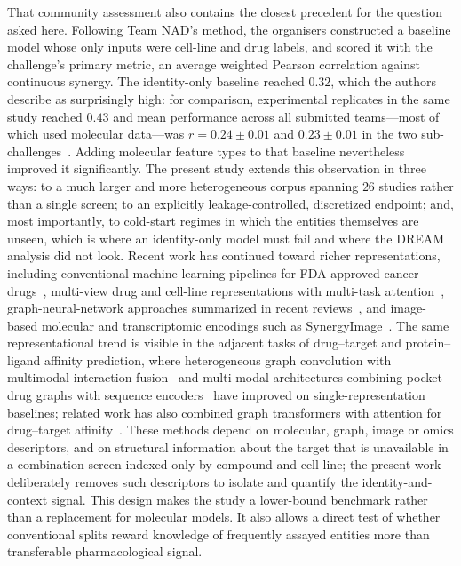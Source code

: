 \documentclass{bmcart}
\begin{document}
That community assessment also contains the closest precedent for the question asked here. Following
Team NAD's method, the organisers constructed a baseline model whose only inputs were cell-line and
drug labels, and scored it with the challenge's primary metric, an average weighted Pearson correlation
against continuous synergy. The identity-only baseline reached $0.32$, which the authors describe as
surprisingly high: for comparison, experimental replicates in the same study reached $0.43$ and mean
performance across all submitted teams---most of which used molecular data---was
$r = 0.24 \pm 0.01$ and $0.23 \pm 0.01$ in the two sub-challenges~\cite{menden2019}. Adding molecular
feature types to that baseline nevertheless improved it significantly. The present study extends this
observation in three ways: to a much larger and more heterogeneous corpus spanning $26$ studies rather
than a single screen; to an explicitly leakage-controlled, discretized endpoint; and, most importantly,
to cold-start regimes in which the entities themselves are unseen, which is where an identity-only
model must fail and where the DREAM analysis did not look. Recent work has
continued toward richer representations, including conventional machine-learning pipelines for
FDA-approved cancer drugs~\cite{abdelhafeez2024}, multi-view drug and cell-line representations with
multi-task attention~\cite{monem2024}, graph-neural-network approaches summarized in recent
reviews~\cite{besharatifard2024}, and image-based molecular and transcriptomic encodings such as
SynergyImage~\cite{mehrabani2025}. The same representational trend is visible in the adjacent tasks of
drug--target and protein--ligand affinity prediction, where heterogeneous graph convolution with
multimodal interaction fusion~\cite{wang2026ihgcn} and multi-modal architectures combining
pocket--drug graphs with sequence encoders~\cite{wang2025mmpd} have improved on single-representation
baselines; related work has also combined graph transformers with attention for drug--target
affinity~\cite{monem2024}. These methods depend on molecular, graph, image or omics
descriptors, and on structural information about the target that is unavailable in a combination
screen indexed only by compound and cell line; the present work deliberately removes such descriptors
to isolate and quantify the identity-and-context signal. This design makes the study a lower-bound benchmark rather than a
replacement for molecular models. It also allows a direct test of whether conventional splits reward
knowledge of frequently assayed entities more than transferable pharmacological signal.
\end{document}
